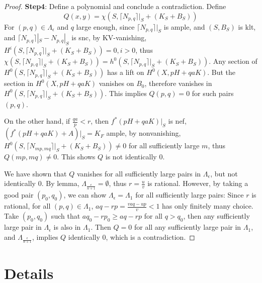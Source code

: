 \documentclass{article}
\begin{document}
\begin{proof}
\textbf{Step4}: Define a polynomial and conclude a contradiction. Define
$$ Q(x,y)=\chi(S,\lceil N_{p,q}\rceil|_S+(K_S+B_S)) $$
For $ (p,q)\in \Lambda_{\epsilon} $ and $ q $ large enough,  since $ \lceil N_{p,q}\rceil|_S  $ is ample, and $ (S,B_S) $ is klt, and $ \lceil N_{p,q}\rceil|_S-N_{p,q}|_S $ is snc, by KV-vanishing, $ H^i(S,\lceil N_{p,q}\rceil|_S+(K_S+B_S))=0, i>0 $, thus $\chi(S,\lceil N_{p,q}\rceil|_S+(K_S+B_S))=h^0(S,\lceil N_{p,q}\rceil|_S+(K_S+B_S))  $. Any section of $ H^0(S,\lceil N_{p,q}\rceil|_S+(K_S+B_S)) $ has a lift on $ H^0(X,pH+qaK) $. But the section in $ H^0(X,pH+qaK) $ vanishes on $ B_0 $, therefore vanishes in $ H^0(S,\lceil N_{p,q}\rceil|_S+(K_S+B_S)) $. This implies $ Q(p,q)=0 $ for such pairs $ (p,q) $.

On the other hand, if $ \frac{qa}{p}<r $, then $ f^*(pH+qaK)|_S $ is nef, $ (f^*(pH+qaK)+A)|_S=K_F $ ample, by nonvanishing, $ H^0(S,\lceil N_{mp,mq}\rceil|_S+(K_S+B_S))\neq 0 $ for all sufficiently large $ m $, thus $ Q(mp,mq)\neq 0 $. This  shows $ Q $ is not identically $ 0 $.

We have shown that $ Q $ vanishes for all sufficiently large pairs in $ \Lambda_{\epsilon} $, but not identically $ 0 $. By lemma, $ \Lambda_{\frac{\epsilon}{n+1}}= \emptyset $, thus $ r=\frac{u}{v} $ is rational. However, by taking a good pair $ (p_0,q_0) $, we can show $ \Lambda_{\epsilon}=\Lambda_1 $ for all sufficiently large pairs: Since $ r $ is rational, for all $ (p,q) \in \Lambda_1$, $ aq-rp=\frac{vaq-up}{v}<1 $ has only finitely many choice. Take $ (p_0,q_0) $ such that $ aq_0-rp_0\geqslant aq-rp $ for all $ q>q_0 $, then any sufficiently large pair in $ \Lambda_{\epsilon} $ is also in $ \Lambda_1 $. Then $ Q=0 $ for all any sufficiently large pair  in $ \Lambda_1 $, and $ \Lambda_{\frac{\epsilon}{n+1}} $, implies $ Q $ identically $ 0 $, which is a contradiction.


\end{proof}



\section{Details}
\end{document}
